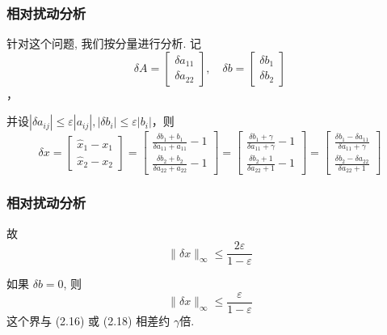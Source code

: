 \documentclass[notheorems,serif]{beamer}
\begin{document}
\begin{frame}
\frametitle{相对扰动分析}
针对这个问题, 我们按分量进行分析. 记
\begin{equation}
\delta A=\left[\begin{array}{c}{\delta a_{11}} \\ {\delta a_{22}}\end{array}\right], \quad \delta b=\left[\begin{array}{c}{\delta b_{1}} \\ {\delta b_{2}}\end{array}\right]
\end{equation}，

并设$\left|\delta a_{i j}\right| \leq \varepsilon\left|a_{i j}\right|,\left|\delta b_{i}\right| \leq \varepsilon\left|b_{i}\right|$，则
\begin{equation}
\delta x=\left[\begin{array}{c}{\hat{x}_{1}-x_{1}} \\ {\hat{x}_{2}-x_{2}}\end{array}\right]=\left[\begin{array}{c}{\frac{\delta b_{1}+b_{1}}{\delta a_{11}+a_{11}}-1} \\ {\frac{\delta b_{2}+b_{2}}{\delta a_{22}+a_{22}}-1}\end{array}\right]=\left[\begin{array}{c}{\frac{\delta b_{1}+\gamma}{\delta a_{11}+\gamma}-1} \\ {\frac{\delta b_{2}+1}{\delta a_{22}+1}-1}\end{array}\right]=\left[\begin{array}{c}{\frac{\delta b_{1}-\delta a_{11}}{\delta a_{11}+\gamma}} \\ {\frac{\delta b_{2}-\delta a_{22}}{\delta a_{22}+1}}\end{array}\right]
\end{equation}
\end{frame}

\begin{frame}
\frametitle{相对扰动分析}
故
\begin{equation}
\|\delta x\|_{\infty} \leq \frac{2 \varepsilon}{1-\varepsilon}
\end{equation}

如果 $δb = 0$, 则
\begin{equation}
\|\delta x\|_{\infty} \leq \frac{\varepsilon}{1-\varepsilon}
\end{equation}
这个界与 (2.16) 或 (2.18) 相差约 $\gamma$倍.
\end{frame}
\end{document}
